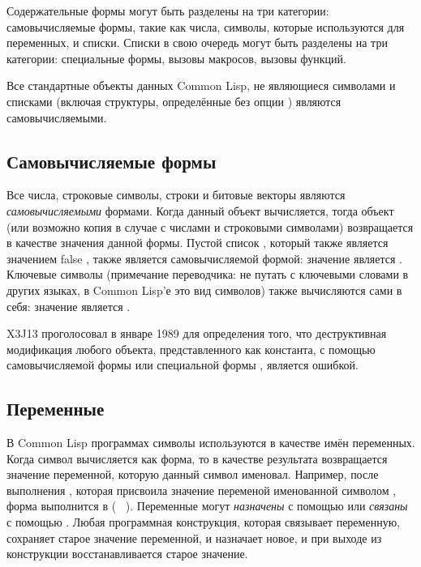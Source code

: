 Содержательные формы могут быть разделены на три категории:
самовычисляемые формы, такие как числа,
символы, которые используются для переменных,
и списки. Списки в свою очередь могут быть разделены на три категории:
специальные формы, 
вызовы макросов,
вызовы функций.

\begin{newer}
Все стандартные объекты данных Common Lisp, не являющиеся символами и списками
(включая  структуры, определённые без опции ) являются
самовычисляемыми. 
\end{newer}

\subsection{Самовычисляемые формы}

Все числа, строковые символы, строки и битовые векторы являются
\emph{самовычисляемыми} формами.
Когда данный объект вычисляется, тогда объект (или возможно копия в случае с
числами и строковыми символами) возвращается в качестве значения данной
формы. Пустой список {\emptylist}, который также является значением false
{\false}, также является самовычисляемой формой: значение {\false} является
{\false}. 
Ключевые символы (примечание переводчика: не путать с ключевыми словами в других
языках, в Common Lisp'е это вид символов) также вычисляются сами в себя:
значение  является .

\begin{newer}
X3J13 проголосовал в январе 1989  для определения
того, что деструктивная модификация любого объекта, представленного как
константа, с помощью самовычисляемой формы или специальной формы ,
является ошибкой.
\end{newer}

\subsection{Переменные}

В Common Lisp программах символы используются в качестве имён переменных.
Когда символ вычисляется как форма, то в качестве результата возвращается
значение переменной, которую данный символ именовал. Например, после выполнения
, которая присвоила значение  переменой именованной
символом , форма  выполнится в  ( \EV\
).
Переменные могут \emph{назначены} с помощью  или \emph{связаны} с
помощью \cdf{let}.
Любая программная конструкция, которая связывает переменную, сохраняет старое
значение переменной, и назначает новое, и при выходе из конструкции
восстанавливается старое значение.

